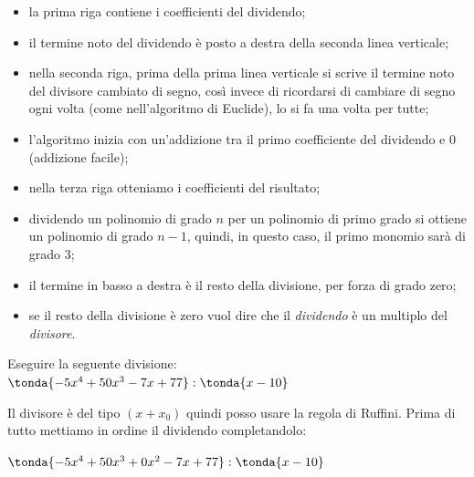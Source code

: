 \begin{osservazioni}{}{}
\begin{itemize} [left=0mm, nosep]
\item la prima riga contiene i coefficienti del dividendo;
\item il termine noto del dividendo è posto a destra della seconda 
linea verticale;
\item nella seconda riga, prima della prima linea verticale si scrive 
il   termine noto del divisore cambiato di segno, così invece di 
ricordarsi di cambiare di segno ogni volta 
(come nell'algoritmo di Euclide), lo si fa una volta per tutte;
\item l'algoritmo inizia con un'addizione tra il primo coefficiente del 
dividendo e \(0\) (addizione facile);
\item nella terza riga otteniamo i coefficienti del risultato;
\item dividendo un polinomio di grado \(n\) per un polinomio di primo 
grado   si ottiene un polinomio di grado \(n-1\), quindi, in questo 
caso, il primo monomio sarà di grado \(3\);
\item il termine in basso a destra è il resto della divisione, 
per forza di   grado zero;
\item se il resto della divisione è zero vuol dire che il 
\emph{dividendo} è un multiplo del \emph{divisore}.
\end{itemize}
\end{osservazioni}

%
\begin{esempio}{}{}
Eseguire la seguente divisione: \\ 
\(\tonda{-5x^4 +50x^3 -7x +77  } : \tonda{x -10}\)

Il divisore è del tipo \((x + x_0)\) quindi posso usare la regola di 
Ruffini.
Prima di tutto mettiamo in ordine il dividendo completandolo:

\(\tonda{-5x^4 +50x^3 +0x^2 -7x +77  } : \tonda{x -10}\)

\end{esempio}

